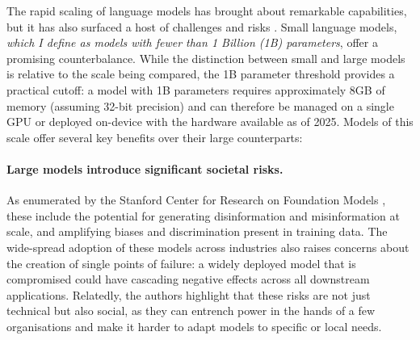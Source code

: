 
The rapid scaling of language models has brought about remarkable capabilities, but it has also surfaced a host of challenges and risks \citep{bommasani2021foundation}. Small language models, \textit{which I define as models with fewer than 1 Billion (1B) parameters}, offer a promising counterbalance. While the distinction between small and large models is relative to the scale being compared, the 1B parameter threshold provides a practical cutoff: a model with 1B parameters requires approximately 8GB of memory (assuming 32-bit precision) and can therefore be managed on a single GPU or deployed on-device with the hardware available as of 2025. Models of this scale offer several key benefits over their large counterparts:

\paragraph{Large models introduce significant societal risks.} As enumerated by the Stanford Center for Research on Foundation Models \citep{bommasani2021foundation}, these include the potential for generating disinformation and misinformation at scale, and amplifying biases and discrimination present in training data. The wide-spread adoption of these models across industries also raises concerns about the creation of single points of failure: a widely deployed model that is compromised could have cascading negative effects across all downstream applications. Relatedly, the authors highlight that these risks are not just technical but also social, as they can entrench power in the hands of a few organisations and make it harder to adapt models to specific or local needs.

